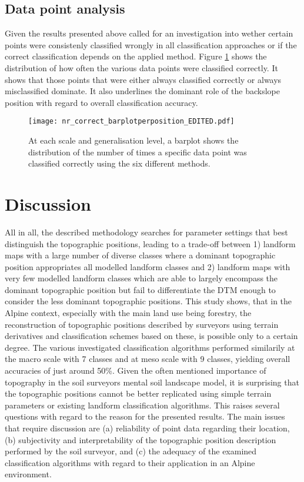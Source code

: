 \documentclass[final,1p,times,twocolumn,authoryear]{elsarticle}
\begin{document}
\subsection{Data point analysis} 
Given the results presented above called for an investigation into wether certain points were consistenly classified wrongly in all classification approaches or if the correct classification depends on the applied method. Figure \ref{fig:hist_correct_per_tp} shows the distribution of how often the various data points were classified correctly. It shows that those points that were either always classified correctly or always misclassified dominate. It also underlines the dominant role of the backslope position with regard to overall classification accuracy.

\begin{figure}
\texttt{[image: nr\_correct\_barplotperposition\_EDITED.pdf]}
\caption{At each scale and generalisation level, a barplot shows the distribution of the number of times a specific data point was classified correctly using the six different methods.}
\label{fig:hist_correct_per_tp}
\end{figure}


\section{Discussion}
All in all, the described methodology searches for parameter settings that best distinguish the topographic positions, leading to a trade-off between 1) landform maps with a large number of diverse classes where a dominant topographic position appropriates all modelled landform classes and 2) landform maps with very few modelled landform classes which are able to largely encompass the dominant topographic position but fail to differentiate the DTM enough to consider the less dominant topographic positions.
This study shows, that in the Alpine context, especially with the main land use being forestry, the reconstruction of topographic positions described by surveyors using terrain derivatives and classification schemes based on these, is possible only to a certain degree. The various investigated classification algorithms performed similarily at the  macro scale with 7 classes and at meso scale with 9 classes, yielding overall accuracies of just around 50\%. Given the often mentioned importance of topography in the soil surveyors mental soil landscape model, it is surprising that the topographic positions cannot be better replicated using simple terrain parameters or existing landform classification algorithms. This raises several questions with regard to the reason for the presented results. The main issues that require discussion are (a) reliability of point data regarding their location, (b) subjectivity and interpretability of the topographic position description performed by the soil surveyor, and (c) the adequacy of the examined classification algorithms with regard to their application in an Alpine environment. 
\end{document}
